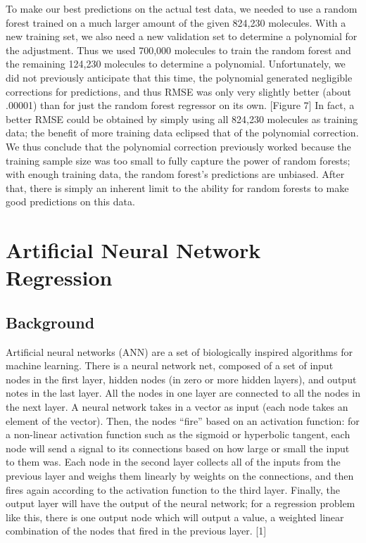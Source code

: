 \documentclass{article}
\begin{document}
To make our best predictions on the actual test data, we needed to use a random forest trained on a much larger amount of the given 824,230 molecules. With a new training set, we also need a new validation set to determine a polynomial for the adjustment. Thus we used 700,000 molecules to train the random forest and the remaining 124,230 molecules to determine a polynomial. Unfortunately, we did not previously anticipate that this time, the polynomial generated negligible corrections for predictions, and thus RMSE was only very slightly better (about .00001) than for just the random forest regressor on its own. [Figure 7] In fact, a better RMSE could be obtained by simply using all 824,230 molecules as training data; the benefit of more training data eclipsed that of the polynomial correction. We thus conclude that the polynomial correction previously worked because the training sample size was too small to fully capture the power of random forests; with enough training data, the random forest's predictions are unbiased. After that, there is simply an inherent limit to the ability for random forests to make good predictions on this data.



\section{Artificial Neural Network Regression}

\subsection{Background}

Artificial neural networks (ANN) are a set of biologically inspired algorithms
for machine learning.  There is a neural network net, composed of a set of input
 nodes in the first layer, hidden nodes (in zero or more hidden layers), and output
  notes in the last layer. All the nodes in one layer are connected to all the nodes 
  in the next layer.  A neural network takes in a vector as input (each node takes an 
  element of the vector).  Then, the nodes “fire” based on an activation function: 
  for a non-linear activation function such as the sigmoid or hyperbolic tangent, 
  each node will send a signal to its connections based on how large or small the 
  input to them was.  Each node in the second layer collects all of the inputs from 
  the previous layer and weighs them linearly by weights on the connections, and then
   fires again according to the activation function to the third layer.  Finally, 
   the output layer will have the output of the neural network; for a regression 
   problem like this, there is one output node which will output a value, a 
   weighted linear combination of the nodes that fired in the previous layer. [1]
\end{document}
